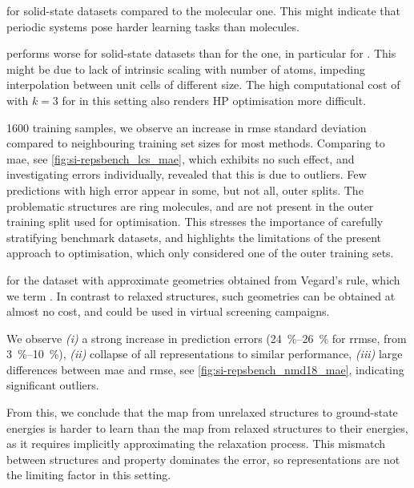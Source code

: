 \clearpage
{} for solid-state datasets compared to the molecular \dsgdb{} one. 
This might indicate that periodic systems pose harder learning tasks than molecules.

\mbtr performs worse for solid-state datasets than for the \dsgdb{} one, in particular for \dstcor{}. 
This might be due to lack of intrinsic scaling with number of atoms, impeding interpolation between unit cells of different size.
The high computational cost of \mbtr with $k{=}3$ for in this setting also renders HP optimisation more difficult.

 \num{1600} training samples, we observe an increase in \gls{rmse} standard deviation compared to neighbouring training set sizes for most methods. 
Comparing to \gls{mae}, see \cref{fig:si-repsbench_lcs_mae}, which exhibits no such effect, and investigating errors individually, revealed that this is due to outliers. Few predictions with high error appear in some, but not all, outer splits. 
The problematic structures are ring molecules, and are not present in the outer training split used for \hp optimisation. 
This stresses the importance of carefully stratifying benchmark datasets, and highlights the limitations of the present approach to \hp optimisation, which only considered one of the outer training sets.


 for the \dstco{} dataset with approximate geometries obtained from Vegard's rule, which we term \dstcou{}.
In contrast to relaxed structures, such geometries can be obtained at almost no cost, and could be used in virtual screening campaigns.

We observe
\emph{(i)} a strong increase in prediction errors (\qtyrange{24}{26}{\percent} for \gls{rrmse}, from \qtyrange{3}{10}{\percent}),  %
\emph{(ii)} collapse of all representations to similar performance,
\emph{(iii)} large differences between \gls{mae} and \gls{rmse}, see \cref{fig:si-repsbench_nmd18_mae}, indicating significant outliers.

From this, we conclude that 
the map from unrelaxed structures to ground-state energies is harder to learn than the map from relaxed structures to their energies, as it requires implicitly approximating the relaxation process.
This mismatch between structures and property dominates the error, so representations are not the limiting factor in this setting.

